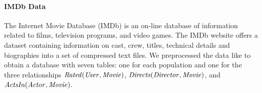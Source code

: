 {				\paragraph{IMDb Data} 
				The Internet Movie Database (IMDb) is an on-line database of information related to films, television programs, and video games.
				The IMDb website offers a dataset containing information on cast, crew, titles, technical details and biographies into a set of compressed text files. 
				We preprocessed the data like \cite{Peralta2007} to obtain a database with seven tables: one for each population and one for the three relationships $\it{Rated}(\it{User},\it{Movie})$, $\it{Directs}(\it{Director},\it{Movie})$, and $\it{ActsIn}(\mathit{Actor},\it{Movie})$.
				
				
}
